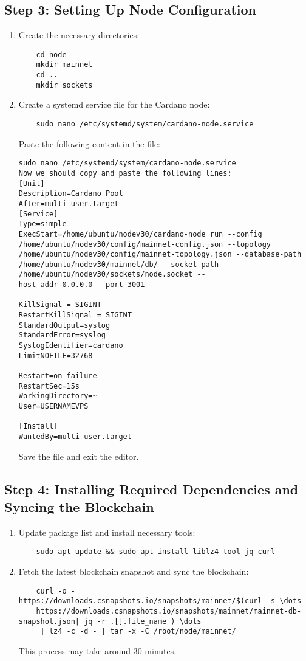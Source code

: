 \subsection{Step 3: Setting Up Node Configuration}
\begin{enumerate}
    \item Create the necessary directories:
    \begin{verbatim}
    cd node
    mkdir mainnet
    cd ..
    mkdir sockets
    \end{verbatim}
    \item Create a systemd service file for the Cardano node:
    \begin{verbatim}
    sudo nano /etc/systemd/system/cardano-node.service
    \end{verbatim}
    
    Paste the following content in the file:

    \begin{verbatim}
sudo nano /etc/systemd/system/cardano-node.service
Now we should copy and paste the following lines:
[Unit]
Description=Cardano Pool
After=multi-user.target
[Service]
Type=simple
ExecStart=/home/ubuntu/nodev30/cardano-node run --config
/home/ubuntu/nodev30/config/mainnet-config.json --topology
/home/ubuntu/nodev30/config/mainnet-topology.json --database-path
/home/ubuntu/nodev30/mainnet/db/ --socket-path  /home/ubuntu/nodev30/sockets/node.socket --
host-addr 0.0.0.0 --port 3001

KillSignal = SIGINT
RestartKillSignal = SIGINT
StandardOutput=syslog
StandardError=syslog
SyslogIdentifier=cardano
LimitNOFILE=32768

Restart=on-failure
RestartSec=15s
WorkingDirectory=~
User=USERNAMEVPS

[Install]
WantedBy=multi-user.target
    \end{verbatim}

    Save the file and exit the editor.
\end{enumerate}

\subsection{Step 4: Installing Required Dependencies and Syncing the Blockchain}
\begin{enumerate}
    \item Update package list and install necessary tools:
    \begin{verbatim}
    sudo apt update && sudo apt install liblz4-tool jq curl
    \end{verbatim}
    \item Fetch the latest blockchain snapshot and sync the blockchain:
    \begin{verbatim}
    curl -o - https://downloads.csnapshots.io/snapshots/mainnet/$(curl -s \dots 
    https://downloads.csnapshots.io/snapshots/mainnet/mainnet-db-snapshot.json| jq -r .[].file_name ) \dots 
     | lz4 -c -d - | tar -x -C /root/node/mainnet/
    \end{verbatim}
    This process may take around 30 minutes.
\end{enumerate}

